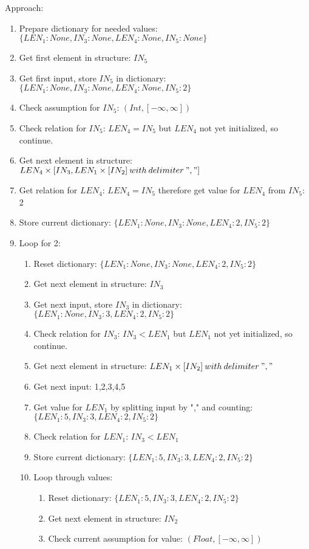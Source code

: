 \documentclass[11pt]{article}
\begin{document}
Approach:
\begin{enumerate}
  \item Prepare dictionary for needed values: $\{LEN_1: None, IN_3: None, LEN_4: None, IN_5: None\}$
  \item Get first element in structure: $IN_5$
  \item Get first input, store $IN_5$ in dictionary: $\{LEN_1: None, IN_3: None, LEN_4: None, IN_5: 2\}$
  \item Check assumption for $IN_5$: $(Int, [-\infty, \infty])$
  \item Check relation for $IN_5$: $LEN_4 = IN_5$ but $LEN_4$ not yet initialized, so continue.
  \item Get next element in structure: $LEN_4 \times [IN_3, LEN_1 \times [IN_2]\:with\:delimiter\:","]$
  \item Get relation for $LEN_4$: $LEN_4 = IN_5$ therefore get value for $LEN_4$ from $IN_5$: 2
  \item Store current dictionary: $\{LEN_1: None, IN_3: None, LEN_4: 2, IN_5: 2\}$
  \item Loop for 2:
  \begin{enumerate}
    \item Reset dictionary: $\{LEN_1: None, IN_3: None, LEN_4: 2, IN_5: 2\}$
    \item Get next element in structure: $IN_3$
    \item Get next input, store $IN_3$ in dictionary: $\{LEN_1: None, IN_3: 3, LEN_4: 2, IN_5: 2\}$
    \item Check relation for $IN_3$: $IN_3 < LEN_1$ but $LEN_1$ not yet initialized, so continue.
    \item Get next element in structure: $LEN_1 \times [IN_2]\:with\:delimiter\:","$
    \item Get next input: 1,2,3,4,5
    \item Get value for $LEN_1$ by splitting input by "," and counting: $\{LEN_1: 5, IN_3: 3, LEN_4: 2, IN_5: 2\}$
    \item Check relation for $LEN_1$: $IN_3 < LEN_1$
    \item Store current dictionary: $\{LEN_1: 5, IN_3: 3, LEN_4: 2, IN_5: 2\}$
    \item Loop through values:
    \begin{enumerate}
      \item Reset dictionary: $\{LEN_1: 5, IN_3: 3, LEN_4: 2, IN_5: 2\}$
      \item Get next element in structure: $IN_2$
      \item Check current assumption for value: $(Float, [-\infty, \infty])$
    \end{enumerate}
  \end{enumerate}
\end{enumerate}
\end{document}
